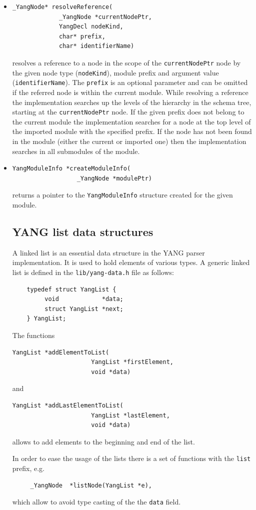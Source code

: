 \documentclass[conference]{IEEEtran}
\begin{document}
\begin{itemize}
\item
\small
\begin{verbatim}
_YangNode* resolveReference(
             _YangNode *currentNodePtr, 
             YangDecl nodeKind, 
             char* prefix, 
             char* identifierName)
\end{verbatim}
\normalsize
resolves a reference to a node in the scope of the \texttt{currentNodePtr} node by the given node type (\texttt{nodeKind}), 
module prefix and argument value (\texttt{identifierName}). The \texttt{prefix} is an optional parameter and can be omitted if the referred node is within the current module.   
While resolving a reference the implementation searches up the levels of the hierarchy in the schema tree, starting at
the \texttt{currentNodePtr} node. If the given prefix does not belong to the current module the implementation searches for a node at the top level of the imported module with the specified prefix.
If the node has not been found in the module (either the current or imported one) then the implementation searches in all submodules of the module.  

\item
\small
\begin{verbatim}
YangModuleInfo *createModuleInfo(
                  _YangNode *modulePtr)
\end{verbatim}
\normalsize
returns a pointer to the \texttt{YangModuleInfo} structure created for the given module.

\subsection{YANG list data structures}
A linked list is an essential data structure in the YANG parser implementation. It is used to hold elements of various types. A generic linked list is defined in the \texttt{lib/yang-data.h} file as follows:
\small
\begin{verbatim}
    typedef struct YangList {
         void  	         *data;
         struct YangList *next;
    } YangList;
\end{verbatim}
\normalsize

The functions 
\small
\begin{verbatim}
YangList *addElementToList(
                      YangList *firstElement, 
                      void *data)
\end{verbatim}
\normalsize
and
\small
\begin{verbatim}
YangList *addLastElementToList(
                      YangList *lastElement, 
                      void *data)
\end{verbatim}
\normalsize
allows to add elements to the beginning and end of the list.

In order to ease the usage of the lists there is a set of functions with the \texttt{list} prefix, e.g.
\small
\begin{verbatim}
     _YangNode  *listNode(YangList *e),
\end{verbatim}
\normalsize
which allow to avoid type casting of the the \texttt{data} field.   

\end{itemize}
\end{document}

